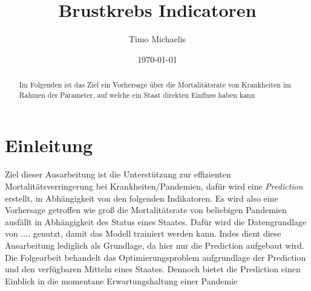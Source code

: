 \documentclass[a4paper,12pt]{article}
\title{Brustkrebs Indicatoren}
\author{Timo Michaelis}
\date{\today}
\begin{document}
\maketitle

\begin{abstract}
Im Folgenden ist das Ziel ein Vorhersage über die Mortalitätsrate von Krankheiten im Rahmen der Parameter, auf welche
    ein Staat direkten Einfluss haben kann

\end{abstract}

\tableofcontents %

\newpage

\section{Einleitung}
Ziel dieser Ausarbeitung ist die Unterstützung zur effizienten Mortalitätsverringerung bei Krankheiten/Pandemien, dafür
wird eine \textit{Prediction} erstellt, in Abhängigkeit von den folgenden Indikatoren.\newline
Es wird also eine Vorhersage getroffen wie groß die Mortalitätsrate von beliebigen Pandemien ausfällt in Abhängigkeit des
Status eines Staates. Dafür wird die Datengrundlage von .... genutzt, damit das Modell trainiert werden kann.
Indes dient diese Ausarbeitung lediglich als Grundlage, da hier nur die Prediction aufgebaut wird. Die Folgearbeit
behandelt das Optimierungsproblem aufgrundlage der Prediction und den verfügbaren Mitteln eines Staates.\newline
Dennoch bietet die Prediction einen Einblick in die momentane Erwartungshaltung einer Pandemie
\end{document}
